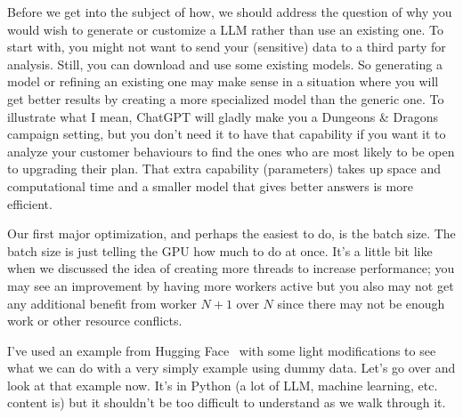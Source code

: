 Before we get into the subject of how, we should address the question of why you would wish to generate or customize a LLM rather than use an existing one. To start with, you might not want to send your (sensitive) data to a third party for analysis. Still, you can download and use some existing models. So generating a model or refining an existing one may make sense in a situation where you will get better results by creating a more specialized model than the generic one. To illustrate what I mean, ChatGPT will gladly make you a Dungeons \& Dragons campaign setting, but you don't need it to have that capability if you want it to analyze your customer behaviours to find the ones who are most likely to be open to upgrading their plan. That extra capability (parameters) takes up space and computational time and a smaller model that gives better answers is more efficient.

Our first major optimization, and perhaps the easiest to do, is the batch size. The batch size is just telling the GPU how much to do at once. It's a little bit like when we discussed the idea of creating more threads to increase performance; you may see an improvement by having more workers active but you also may not get any additional benefit from worker $N+1$ over $N$ since there may not be enough work or other resource conflicts.

I've used an example from Hugging Face~\cite{hf2} with some light modifications to see what we can do with a very simply example using dummy data. Let's go over and look at that example now. It's in Python (a lot of LLM, machine learning, etc. content is) but it shouldn't be too difficult to understand as we walk through it.

